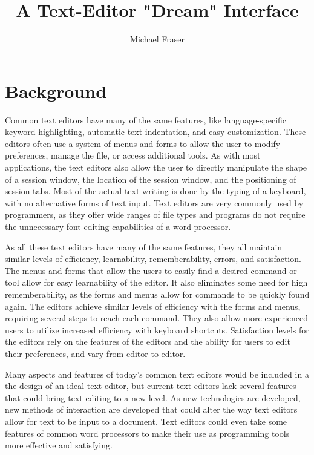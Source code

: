 \documentclass[11pt, oneside]{article}
\begin{document}
\title{A Text-Editor "Dream" Interface}
\author{Michael Fraser}
\maketitle

\tableofcontents

\section{Background}
Common text editors have many of the same features, like language-specific keyword highlighting, automatic text indentation, and easy customization. These editors often use a system of menus and forms to allow the user to modify preferences, manage the file, or access additional tools. As with most applications, the text editors also allow the user to directly manipulate the shape of a session window, the location of the session window, and the positioning of session tabs. Most of the actual text writing is done by the typing of a keyboard, with no alternative forms of text input. Text editors are very commonly used by programmers, as they offer wide ranges of file types and programs do not require the unnecessary font editing capabilities of a word processor.

As all these text editors have many of the same features, they all maintain similar levels of efficiency, learnability, rememberability, errors, and satisfaction. The menus and forms that allow the users to easily find a desired command or tool allow for easy learnability of the editor. It also eliminates some need for high rememberability, as the forms and menus allow for commands to be quickly found again. The editors achieve similar levels of efficiency with the forms and menus, requiring several steps to reach each command. They also allow more experienced users to utilize increased efficiency with keyboard shortcuts. Satisfaction levels for the editors rely on the features of the editors and the ability for users to edit their preferences, and vary from editor to editor. %

Many aspects and features of today's common text editors would be included in a the design of an ideal text editor, but current text editors lack several features that could bring text editing to a new level. As new technologies are developed, new methods of interaction are developed that could alter the way text editors allow for text to be input to a document. Text editors could even take some features of common word processors to make their use as programming tools more effective and satisfying. 

\section{}
\end{document}

